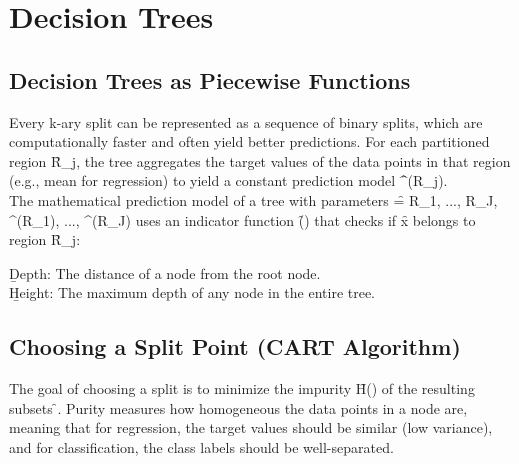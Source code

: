 \section{Decision Trees}

\subsection{Decision Trees as Piecewise Functions}

\vspace{.5em}
Every k-ary split can be represented as a sequence of binary splits, which are computationally faster and often yield better predictions. For each partitioned region \f{R_j}, the tree aggregates the target values of the data points in that region (e.g., mean for regression) to yield a constant prediction model \f{^{(R_j)}}.\\[.5em]
The mathematical prediction model of a tree with parameters \f{\theta = \langle R_1, ..., R_J, ^{(R_1)}, ..., ^{(R_J)} \rangle} uses an indicator function \f{(\cdot)} that checks if \f{x} belongs to region \f{R_j}:

\vspace{1em}

\b{Depth}: The distance of a node from the root node.\\[.5em]
\b{Height}: The maximum depth of any node in the entire tree.




\subsection{Choosing a Split Point (CART Algorithm)}
The goal of choosing a split is to minimize the impurity \f{H()} of the resulting subsets \f{}. Purity measures how homogeneous the data points in a node are, meaning that for regression, the target values should be similar (low variance), and for classification, the class labels should be well-separated.\\

